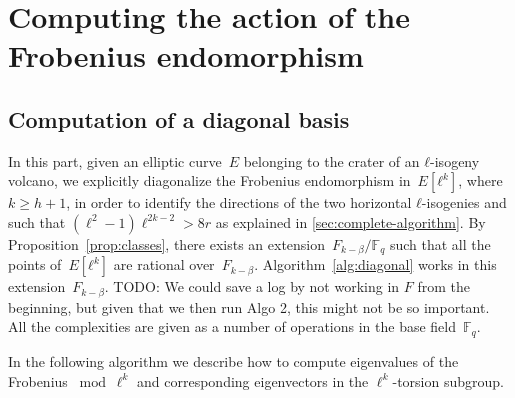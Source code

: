 \documentclass{lms}
\newcommand{\todo}[1]{{\color{red}TODO: #1}}
\newcommand{\F}{\mathbb{F}}
\begin{document}
\section{Computing the action of the Frobenius endomorphism}
\label{sec:acti-frob-endm}
\subsection{Computation of a diagonal basis}
\label{ss:diagonal}

In this part, given an elliptic curve~$E$ belonging to the crater of
an $ℓ$-isogeny volcano, we explicitly diagonalize the Frobenius
endomorphism in~$E[ℓ^k]$, where $k ≥ h+1$, in order to identify the
directions of the two horizontal $ℓ$-isogenies and such that $(\ell^2-1)\ell^{2k-2}>8r$ as explained in \ref{sec:complete-algorithm}.  By
Proposition~\ref{prop:classes}, there exists an
extension~$F_{k-\beta}/\F_q$ %
such that all the points
of~$E[ℓ^k]$ are rational over~$F_{k-\beta}$.  Algorithm~\ref{alg:diagonal} works
in this extension~$F_{k-\beta}$. \todo{We could save a log by not working in $F$
  from the beginning, but given that we then run Algo 2, this might
  not be so important.}  All the complexities are given as a number of
operations in the base field~$\mathbb F_q$.

In the following algorithm we describe how to compute eigenvalues of
the Frobenius $\bmod \ell^k$ and
corresponding eigenvectors in the $\ell^{k}$-torsion subgroup.
\end{document}

